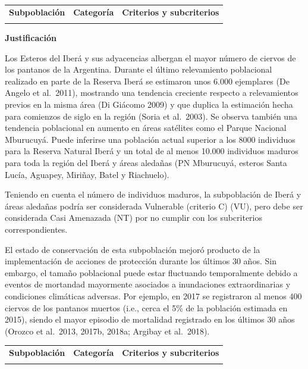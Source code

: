\documentclass[
  x11names]{article}
\begin{document}
\begin{tabu} to 
\toprule
\textbf{Subpoblación} & \textbf{Categoría} & \textbf{Criterios y subcriterios}\\
\midrule
{} &  & \\
\bottomrule
\end{tabu}

\textbf{Justificación}

Los Esteros del Iberá y sus adyacencias albergan el mayor número de
ciervos de los pantanos de la Argentina. Durante el último relevamiento
poblacional realizado en parte de la Reserva Iberá se estimaron unos
6.000 ejemplares (De Angelo et al.~2011), mostrando una tendencia
creciente respecto a relevamientos previos en la misma área (Di Giácomo
2009) y que duplica la estimación hecha para comienzos de siglo en la
región (Soria et al.~2003). Se observa también una tendencia poblacional
en aumento en áreas satélites como el Parque Nacional Mburucuyá. Puede
inferirse una población actual superior a los 8000 individuos para la
Reserva Natural Iberá y un total de al menos 10.000 individuos maduros
para toda la región del Iberá y áreas aledañas (PN Mburucuyá, esteros
Santa Lucía, Aguapey, Miriñay, Batel y Riachuelo).

Teniendo en cuenta el número de individuos maduros, la subpoblación de
Iberá y áreas aledañas podría ser considerada Vulnerable (criterio C)
(VU), pero debe ser considerada Casi Amenazada (NT) por no cumplir con
los subcriterios correspondientes.

El estado de conservación de esta subpoblación mejoró producto de la
implementación de acciones de protección durante los últimos 30 años.
Sin embargo, el tamaño poblacional puede estar fluctuando temporalmente
debido a eventos de mortandad mayormente asociados a inundaciones
extraordinarias y condiciones climáticas adversas. Por ejemplo, en 2017
se registraron al menos 400 ciervos de los pantanos muertos (i.e., cerca
el 5\% de la población estimada en 2015), siendo el mayor episodio de
mortalidad registrado en los últimos 30 años (Orozco et al.~2013, 2017b,
2018a; Argibay et al.~2018).\vspace{0.5cm}

\begin{tabu} to 
\toprule
\textbf{Subpoblación} & \textbf{Categoría} & \textbf{Criterios y subcriterios}\\
\midrule
{} &  & \\
\bottomrule
\end{tabu}
\end{document}
